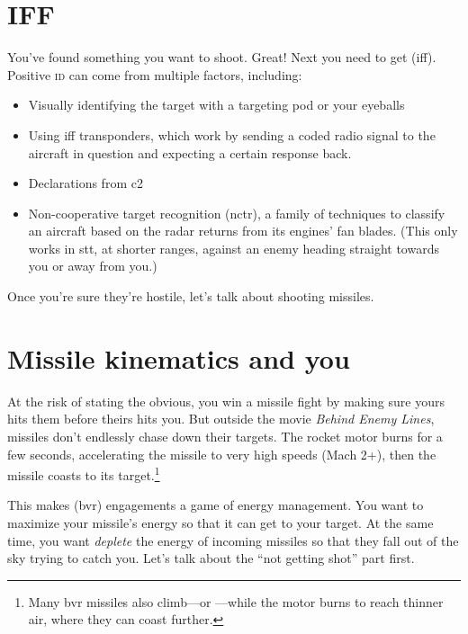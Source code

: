 \section{IFF}

You've found something you want to shoot. Great!
Next you need to get  \ac{(iff)}.
Positive \textsc{id} can come from multiple factors, including:
\begin{itemize}
\item Visually identifying the target with a targeting pod or your eyeballs
\item Using \ac{iff} transponders, which work by sending a coded radio signal
    to the aircraft in question and expecting a certain response back.
\item Declarations from \ac{c2}
\item Non-cooperative target recognition \ac{(nctr)},
    a family of techniques to classify an aircraft based
    on the radar returns from its engines' fan blades.
    (This only works in \ac{stt}, at shorter ranges,
    against an enemy heading straight towards you or away from you.)
\end{itemize}
Once you're sure they're hostile, let's talk about shooting missiles.

\section{Missile kinematics and you}

At the risk of stating the obvious, you win a missile fight by making sure yours
hits them before theirs hits you.
But outside the movie \emph{Behind Enemy Lines},
missiles don't endlessly chase down their targets.
The rocket motor burns for a few seconds,
accelerating the missile to very high speeds (Mach 2+),
then the missile coasts to its target.\punckern\footnote{Many
\ac{bvr} missiles also climb---or ---while the motor burns
to reach thinner air, where they can coast further.}

This makes  \ac{(bvr)} engagements
a game of energy management.
You want to maximize your missile's energy so that it can get to your target.
At the same time, you want \emph{deplete} the energy of incoming missiles
so that they fall out of the sky trying to catch you.
Let's talk about the ``not getting shot'' part first.

